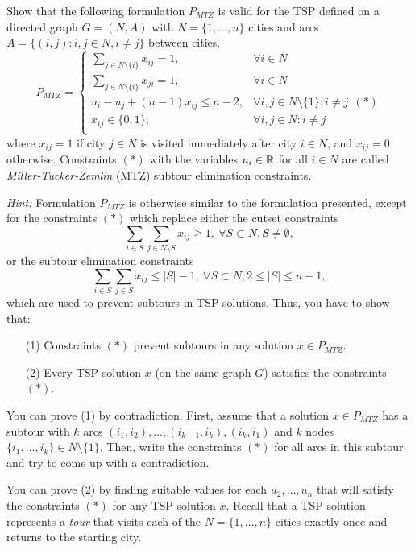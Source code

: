 Show that the following formulation $P_{MTZ}$ is valid for the TSP defined on a directed graph \lb $G = (N,A)$ with $N = \{1,\dots,n\}$ cities and arcs $A = \{(i,j) : i,j\in N, i\neq j\}$ between cities.
\renewcommand*{\arraystretch}{1.3}
\[P_{MTZ} = \left\{
   \begin{array}{ll}
   \displaystyle \sum_{j \in N \setminus \{i\}} x_{ij} = 1, & \forall i \in N \\
   \displaystyle \sum_{j \in N \setminus \{i\}} x_{ji} = 1, & \forall i \in N \\   
   \displaystyle u_{i} - u_{j} + (n-1) x_{ij} \leq n - 2, & \forall i,j \in N \setminus \{ 1 \} : i \neq j ~~(*)\\
    x_{ij} \in \{0,1\}, & \forall i,j \in N : i\neq j\\
  \end{array}
\right.
\]
where $x_{ij} = 1$ if city $j\in N$ is visited immediately after city $i \in N$, and $x_{ij} = 0$ otherwise. Constraints $(*)$ with the variables $u_i \in \mathbb{R}$ for all $i\in N$ are called \emph{Miller-Tucker-Zemlin} (MTZ) subtour elimination constraints. 

\emph{Hint:} Formulation $P_{MTZ}$ is otherwise similar to the formulation presented, except for the constraints $(*)$ which replace either the cutset constraints
$$\sum_{i \in S}\sum_{j \in N \setminus S}x_{ij} \geq 1, \ \forall S \subset N, S \neq \emptyset,$$
or the subtour elimination constraints        
$$\sum_{i \in S}\sum_{j \in S}x_{ij} \leq |S|-1, \ \forall S \subset N, 2 \leq |S| \leq n-1,$$
which are used to prevent subtours in TSP solutions. Thus, you have to show that: 
\begin{enumerate}
	\item[(1)] Constraints $(*)$ prevent subtours in any solution $x\in P_{MTZ}$.
	\item[(2)]Every TSP solution $x$ (on the same graph $G$) satisfies the constraints $(*)$.
\end{enumerate}
You can prove (1) by contradiction. First, assume that a solution $x\in P_{MTZ}$ has a subtour with $k$ arcs $(i_1,i_2),\dots,(i_{k-1},i_k),(i_k,i_1)$ and $k$ nodes $\{i_1,\dots,i_k\} \in N\setminus\{1\}$. Then, write the constraints $(*)$ for all arcs in this subtour and try to come up with a contradiction.

You can prove (2) by finding suitable values for each $u_2,\dots,u_n$ that will satisfy the constraints $(*)$ for any TSP solution $x$. Recall that a TSP solution represents a \emph{tour} that visits each of the $N = \{1,\dots,n\}$ cities exactly once and returns to the starting city.
